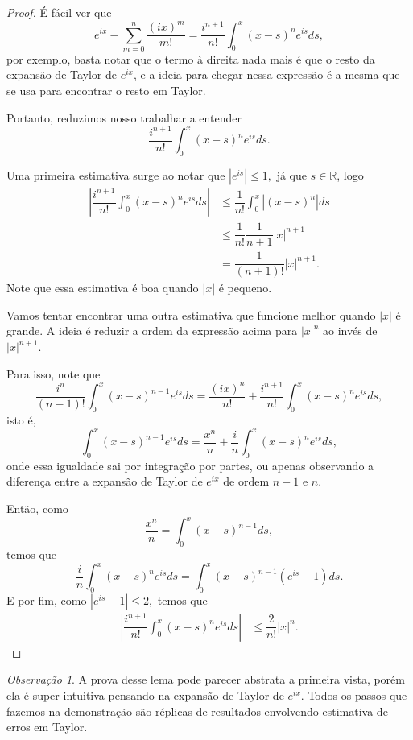 \documentclass[12pt,a4paper,oneside]{book}
\theoremstyle{definition}
\theoremstyle{remark}
\newtheorem{remark}[theorem]{Observa\c{c}\~ao}
\numberwithin{equation}{section}
\newcommand{\R}{\mathbb{R}}
\begin{document}
 
 
\begin{proof}
É fácil ver que
$$e^{ix} - \sum_{m=0}^n \dfrac{(ix)^m}{m!} = \dfrac{i^{n+1}}{n!}\int_0^x (x-s)^n e^{is}ds,  $$
por exemplo, basta notar que o termo à direita nada mais é que o resto da expansão de Taylor de $e^{ix}$, e a ideia para chegar nessa expressão é a mesma que se usa para encontrar o resto em Taylor.

Portanto, reduzimos nosso trabalhar a entender
$$\dfrac{i^{n+1}}{n!}\int_0^x (x-s)^n e^{is}ds.$$

Uma primeira estimativa surge ao notar que $|e^{is}|\leq 1,$ já que $s\in \R$, logo
\begin{align*}
\left|\dfrac{i^{n+1}}{n!}\int_0^x (x-s)^n e^{is}ds \right|
&\leq \dfrac{1}{n!}\int_0^x |(x-s)^n| ds\\
& \leq \dfrac{1}{n!}\dfrac{1}{n+1} |x|^{n+1}\\ 
&=\dfrac{1}{(n+1)!} |x|^{n+1} . 
\end{align*}
Note que essa estimativa é boa quando $|x|$ é pequeno.

Vamos tentar encontrar uma outra estimativa que funcione melhor quando $|x|$ é grande. A ideia  é reduzir a ordem da expressão acima para $|x|^n$ ao invés de $|x|^{n+1}.$

Para isso, note que
$$\dfrac{i^{n}}{(n-1)!}\int_0^x (x-s)^{n-1} e^{is}ds = \dfrac{(ix)^{n}}{n!}+\dfrac{i^{n+1}}{n!}\int_0^x (x-s)^{n} e^{is}ds, $$
isto é,
$$\int_0^x (x-s)^{n-1} e^{is}ds = \dfrac{x^{n}}{n}+\dfrac{i}{n}\int_0^x (x-s)^{n} e^{is}ds, $$
onde essa igualdade sai por integração por partes, ou apenas observando a diferença entre a expansão de Taylor de $e^{ix}$ de ordem $n-1$ e $n.$

Então, como 
$$\dfrac{x^n}{n} = \int_0^x(x-s)^{n-1}ds, $$
temos que
$$\dfrac{i}{n}\int_0^x (x-s)^{n} e^{is}ds = \int_0^x (x-s)^{n-1}( e^{is}-1)ds . $$
E por fim, como $|e^{is}-1|\leq 2,$ temos que
\begin{align*}
\left|\dfrac{i^{n+1}}{n!}\int_0^x (x-s)^n e^{is}ds \right|
&\leq \dfrac{2}{n!} |x|^{n} . 
\end{align*}

\end{proof}
\begin{tcolorbox}[colback = yellow!60]
\begin{remark}
A prova desse lema pode parecer abstrata a primeira vista, porém ela é super intuitiva pensando na expansão de Taylor de $e^{ix}$. Todos os passos que fazemos na demonstração são réplicas de resultados envolvendo estimativa de erros em Taylor.
\end{remark}

\end{tcolorbox}
\end{document}
